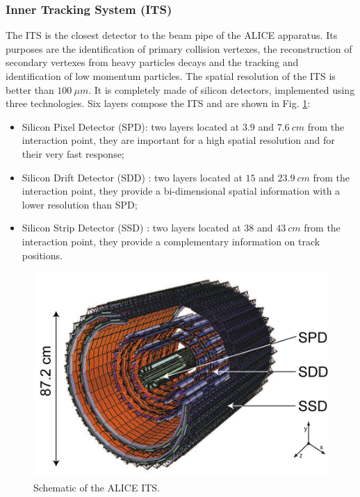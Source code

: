 \subsubsection{Inner Tracking System (ITS)}
The ITS is the closest detector to the beam pipe of the ALICE apparatus.
Its purposes are the identification of primary collision vertexes, the reconstruction of secondary vertexes from heavy particles decays and the tracking and identification of low momentum particles.
The spatial resolution of the ITS is better than $100\ \mu m$.
It is completely made of silicon detectors, implemented using three technologies.
Six layers compose the ITS and are shown in Fig. \ref{fig:ITS}:
\begin{itemize}
    \item Silicon Pixel Detector (SPD): two layers located at $3.9$ and $7.6\ cm$ from the interaction point, they are important for a high spatial resolution and for their very fast response;
    \item Silicon Drift Detector (SDD) : two layers located at $15$ and $23.9\ cm$ from the interaction point, they provide a bi-dimensional spatial information with a lower resolution than SPD;
    \item Silicon Strip Detector (SSD) : two layers located at $38$ and $43\ cm$ from the interaction point, they provide a complementary information on track positions.
\end{itemize}


\begin{figure}[!h]
\begin{center}
\includegraphics[width=0.7\linewidth]{Chapters/Introduction/Figs/its.png}
\caption{Schematic of the ALICE ITS.}
\label{fig:ITS}
\end{center}
\end{figure}

